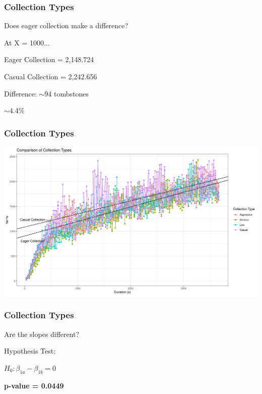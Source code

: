 \documentclass{beamer}
\begin{document}
    \begin{frame}[shrink]
        \frametitle{Collection Types}
        Does eager collection make a difference?

        \bigskip
        \bigskip
        \bigskip

        \begin{center}
            At X = 1000...

            Eager Collection = 2,148.724

            Casual Collection = 2,242.656

            Difference: $\sim$94 tombstones

            $\sim$4.4\%

        \end{center}
    \end{frame}

    \begin{frame}
        \frametitle{Collection Types}
        \includegraphics[width=\textwidth]{CollectionType3_1}
    \end{frame}

    \begin{frame}[shrink]
        \frametitle{Collection Types}
        Are the slopes different?

        \bigskip
        \bigskip
        \bigskip

        \begin{center}
            Hypothesis Test:

            {\small $H_{0}: \beta_{1a} - \beta_{1b} = 0$}

            \pause

            \textbf{p-value = 0.0449}
        \end{center}
    \end{frame}
\end{document}
